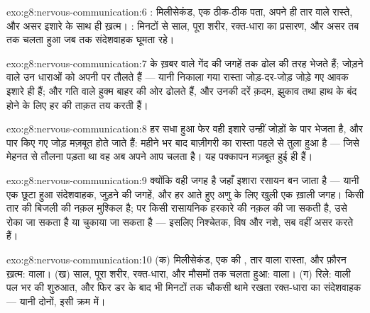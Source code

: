 \begin{solution}{exo:g8:nervous-communication:6}
: मिलीसेकंड, एक ठीक-ठीक पता, अपने ही तार वाले रास्ते, और असर
इशारे के साथ ही ख़त्म। : मिनटों से साल, पूरा शरीर, रक्त-धारा का
प्रसारण, और असर तब तक चलता हुआ जब तक संदेशवाहक घूमता रहे।
\end{solution}

\begin{solution}{exo:g8:nervous-communication:7}
 के ख़बर वाले  गेंद की जगहें  तक ढोल की तरह भेजते
हैं; जोड़ने वाले  उन धाराओं को अपनी  पर तौलते हैं
--- यानी निकाला गया रास्ता जोड़-दर-जोड़ जोड़े गए आवक इशारे ही हैं; और
गति वाले  हुक्म बाहर की ओर ढोलते हैं, और उनकी दरें क़दम, झुकाव तथा
हाथ के बंद होने के लिए हर  की ताक़त तय करती हैं।
\end{solution}

\begin{solution}{exo:g8:nervous-communication:8}
हर सधा हुआ फेर वही इशारे उन्हीं जोड़ों के पार भेजता है, और पार किए गए
जोड़ मज़बूत होते जाते हैं: महीने भर बाद बाज़ीगरी का रास्ता पहले से तुला
हुआ है --- जिसे मेहनत से तौलना पड़ता था वह अब अपने आप चलता है। यह
पक्कापन मज़बूत हुई  ही हैं।
\end{solution}

\begin{solution}{exo:g8:nervous-communication:9}
क्योंकि  वही जगह है जहाँ इशारा रसायन बन जाता है --- यानी एक
छूटा हुआ संदेशवाहक, जुड़ने की जगहें, और हर आते हुए अणु के लिए खुली एक
ख़ाली जगह। किसी तार की बिजली की नक़ल मुश्किल है; पर किसी रासायनिक हरकारे
की नक़ल की जा सकती है, उसे रोका जा सकता है या चुकाया जा सकता है --- इसलिए
निश्चेतक, विष और नशे, सब वहीं असर करते हैं।
\end{solution}

\begin{solution}{exo:g8:nervous-communication:10}
(क) मिलीसेकंड, एक  की , तार वाला रास्ता, और फ़ौरन ख़त्म:
 वाला। (ख) साल, पूरा शरीर, रक्त-धारा, और मौसमों तक चलता हुआ:
 वाला। (ग) रिले:  वाली पल भर की शुरुआत, और फिर डर के बाद
भी मिनटों तक चौकसी थामे रखता रक्त-धारा का संदेशवाहक --- यानी दोनों, इसी
क्रम में।
\end{solution}

